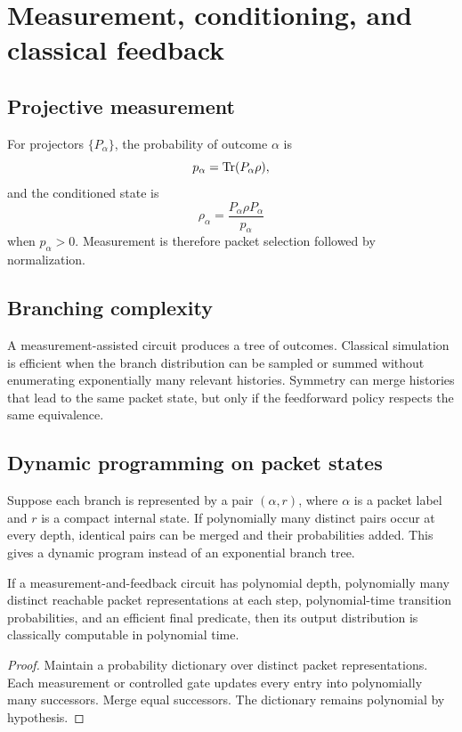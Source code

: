 \chapter{Measurement, conditioning, and classical feedback}
\label{ch:measurement}

\section{Projective measurement}
For projectors $\{P_\alpha\}$, the probability of outcome $\alpha$ is
\[
p_\alpha
=
\operatorname{Tr}(P_\alpha\rho),
\]
and the conditioned state is
\[
\rho_\alpha
=
\frac{P_\alpha\rho P_\alpha}{p_\alpha}
\]
when $p_\alpha>0$. Measurement is therefore packet selection followed by normalization.

\section{Branching complexity}
A measurement-assisted circuit produces a tree of outcomes. Classical simulation is efficient when the branch distribution can be sampled or summed without enumerating exponentially many relevant histories. Symmetry can merge histories that lead to the same packet state, but only if the feedforward policy respects the same equivalence.

\section{Dynamic programming on packet states}
Suppose each branch is represented by a pair $(\alpha,r)$, where $\alpha$ is a packet label and $r$ is a compact internal state. If polynomially many distinct pairs occur at every depth, identical pairs can be merged and their probabilities added. This gives a dynamic program instead of an exponential branch tree.

\begin{proposition}
If a measurement-and-feedback circuit has polynomial depth, polynomially many distinct reachable packet representations at each step, polynomial-time transition probabilities, and an efficient final predicate, then its output distribution is classically computable in polynomial time.
\end{proposition}

\begin{proof}
Maintain a probability dictionary over distinct packet representations. Each measurement or controlled gate updates every entry into polynomially many successors. Merge equal successors. The dictionary remains polynomial by hypothesis.
\end{proof}

